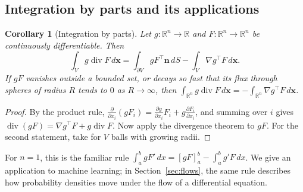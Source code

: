 \documentclass[11pt]{article}
\theoremstyle{definition}
\theoremstyle{plain}
\newtheorem{corollary}[definition]{Corollary}
\theoremstyle{remark}
\DeclareMathOperator{\Div}{div}
\begin{document}
\subsection{Integration by parts and its applications}

\begin{corollary}[Integration by parts]\label{cor:integration-by-parts}
    Let $g: \mathbb{R}^n \to \mathbb{R}$ and $F: \mathbb{R}^n \to \mathbb{R}^n$ be continuously differentiable. Then
    \[\int_V g\Div F\, d\mathbf{x} = \int_{\partial V} gF^\top\mathbf{n}\, dS - \int_V \nabla g^\top F\, d\mathbf{x}.\]
    If $gF$ vanishes outside a bounded set, or decays so fast that its flux through spheres of radius $R$ tends to $0$ as $R \to \infty$, then $\int_{\mathbb{R}^n} g\Div F\, d\mathbf{x} = -\int_{\mathbb{R}^n} \nabla g^\top F\, d\mathbf{x}$.
\end{corollary}

\begin{proof}
    By the product rule, $\frac{\partial}{\partial x_i}(gF_i) = \frac{\partial g}{\partial x_i}F_i + g\frac{\partial F_i}{\partial x_i}$, and summing over $i$ gives $\Div(gF) = \nabla g^\top F + g\Div F$. Now apply the divergence theorem to $gF$. For the second statement, take for $V$ balls with growing radii.
\end{proof}

For $n = 1$, this is the familiar rule $\int_a^b gF'\, dx = [gF]_a^b - \int_a^b g'F\, dx$. We give an application to machine learning; in Section~\ref{sec:flows}, the same rule describes how probability densities move under the flow of a differential equation.
\end{document}
